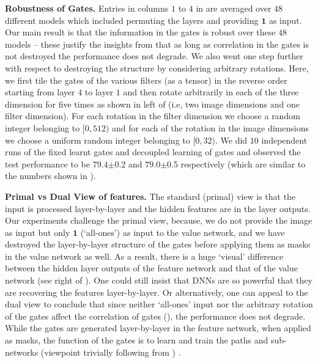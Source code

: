 \textbf{Robustness of Gates.} Entries in columns $1$ to $4$ in  are  averaged over $48$ different models which included  permuting the layers and providing $\mathbf{1}$ as input. Our main result is that the information in the gates is robust over these $48$ models -- these justify the insights from  that as long as correlation in the gates is not destroyed the performance does not degrade. We also went one step further with respect to destroying the structure by considering arbitrary rotations. Here, we first tile the gates of the various filters (as a tensor) in the reverse order starting from layer $4$ to layer $1$ and then rotate arbitrarily in each of the three dimension for five times as shown in left of  (i.e, two image dimensions and one filter dimension). For each rotation in the filter dimension we choose a random integer belonging to  $[0,512)$ and for each of the rotation in the image dimensions we choose a uniform random integer belonging to $[0,32)$. We did $10$ independent runs of the fixed learnt gates and decoupled learning of gates and observed the test performance to be $79.4${\tiny$\pm$0.2} and $79.0${\tiny$\pm$0.5} respectively (which are similar to the numbers shown in ).


\textbf{Primal vs Dual View of features.} The standard (primal) view is that the input is processed layer-by-layer and the hidden features are in the layer outputs. 
Our experiments challenge the primal view, because, 
we do not provide the image as input but only $\mathbf{1}$ (`all-ones') as input to the value network, and we have destroyed the layer-by-layer structure of the gates before applying them as masks in the value network as well.  As a result, there is a huge `visual' difference between the hidden layer outputs of the feature network and that of the value network (see right of ).  One could still insist that DNNs are so powerful that they are recovering the features layer-by-layer. Or alternatively, one can appeal to the dual view to conclude that since neither `all-ones' input nor the arbitrary rotation of the gates affect the correlation of gates (), the performance does not degrade. While the gates are generated layer-by-layer in the feature network, when applied as masks, the function of the gates is to learn and train the paths and sub-networks (viewpoint trivially following from ) .


